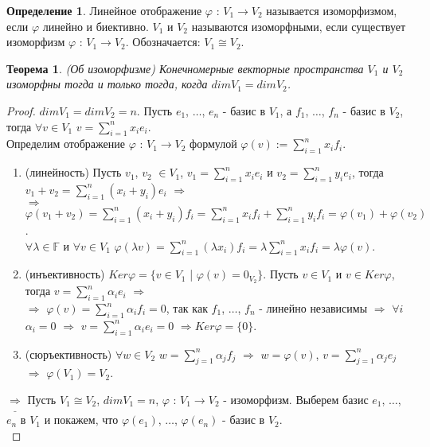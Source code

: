 \documentclass[a4paper, 12pt]{article}
\newcommand{\F}{\mathbb F}
\renewcommand{\phi}{\varphi}
\theoremstyle{definition}
\newtheorem*{definition}{Определение}
\theoremstyle{plain}
\newtheorem*{theorem}{Теорема}
\theoremstyle{remark}
\begin{document}
  \newpage
  \begin{definition}
    Линейное отображение $\phi$ : $V_1 \to V_2$ называется изоморфизмом, если $\phi$ линейно и биективно. $V_1$ и $V_2$ называются изоморфными, если существует изоморфизм $\phi$ : $V_1 \to V_2$. Обозначается: $V_1 \cong V_2$.
  \end{definition}
  \begin{theorem}(Об изоморфизме)
    Конечномерные векторные пространства $V_1$ и $V_2$ изоморфны тогда и только тогда, когда $dimV_1 = dimV_2$. 
  \end{theorem}
  \begin{proof}
    $dimV_1=dimV_2=n$. Пусть $e_1$, $\ldots$, $e_n$ - базис в $V_1$, а $f_1$, $\ldots$, $f_n$ - базис в $V_2$, тогда $\forall v \in V_1$ $v=\sum\limits_{i=1}^nx_ie_i$.\\ Определим отображение $\phi$ : $V_1 \to V_2$ формулой $\phi(v):=\sum\limits_{i=1}^nx_if_i$.
    \begin{enumerate}
      \item (линейность) Пусть $v_1$, $v_2$ $\in V_1$, $v_1=\sum\limits_{i=1}^nx_ie_i$ и $v_2=\sum\limits_{i=1}^ny_ie_i$, тогда\\ $v_1+v_2=\sum\limits_{i=1}^n(x_i+y_i)e_i$ $\Longrightarrow$\\ $\Longrightarrow$ $\phi(v_1+v_2) = \sum\limits_{i=1}^n(x_i+y_i)f_i=\sum\limits_{i=1}^nx_if_i+\sum\limits_{i=1}^ny_if_i=\phi(v_1)+\phi(v_2)$.\\ $\forall\lambda\in\F$ и $\forall v\in V_1$ $\phi(\lambda v)=\sum\limits_{i=1}^n(\lambda x_i)f_i =\lambda\sum\limits_{i=1}^nx_if_i=\lambda\phi(v)$.
      \item (инъективность) $Ker\phi = \{v\in V_1$ | $\phi(v)=0_{V_2}\}$. Пусть $v\in V_1$ и $v\in Ker\phi$, тогда $v=\sum\limits_{i=1}^n\alpha_ie_i$ $\Longrightarrow$\\$\Longrightarrow$ $\phi(v)=\sum\limits_{i=1}^n\alpha_if_i=0$, так как $f_1$, $\ldots$, $f_n$ - линейно независимы $\Longrightarrow$ $\forall i$ $\alpha_i=0$ $\Longrightarrow$ $v=\sum\limits_{i=1}^n\alpha_ie_i=0$ $\Longrightarrow$$Ker\phi=\{0\}$.
      \item (сюръективность) $\forall w\in V_2$ $w=\sum\limits_{j=1}^n\alpha_jf_j$ $\Longrightarrow$ $w=\phi(v)$, $v=\sum\limits_{j=1}^n\alpha_je_j$ $\Longrightarrow$ $\phi(V_1)=V_2$.
    \end{enumerate}
    $\underline{\Longrightarrow}$ Пусть $V_1\cong V_2$, $dimV_1=n$, $\phi$ : $V_1 \to V_2$ - изоморфизм. Выберем базис $e_1$, $\ldots$, $e_n$ в $V_1$ и покажем, что $\phi(e_1)$, $\ldots$, $\phi(e_n)$ - базис в $V_2$.\\

\end{proof}
\end{document}
